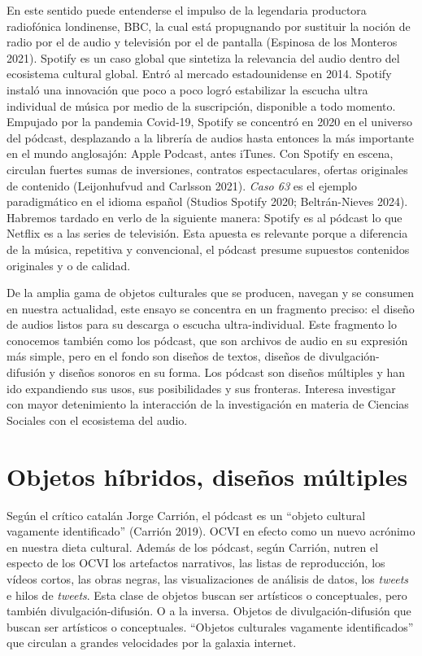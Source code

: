 \documentclass[
]{interact}
\begin{document}
En este sentido puede entenderse el impulso de la legendaria productora
radiofónica londinense, BBC, la cual está propugnando por sustituir la
noción de radio por el de audio y televisión por el de pantalla
(Espinosa de los Monteros 2021). Spotify es un caso global que sintetiza
la relevancia del audio dentro del ecosistema cultural global. Entró al
mercado estadounidense en 2014. Spotify instaló una innovación que poco
a poco logró estabilizar la escucha ultra individual de música por medio
de la suscripción, disponible a todo momento. Empujado por la pandemia
Covid-19, Spotify se concentró en 2020 en el universo del pódcast,
desplazando a la librería de audios hasta entonces la más importante en
el mundo anglosajón: Apple Podcast, antes iTunes. Con Spotify en escena,
circulan fuertes sumas de inversiones, contratos espectaculares, ofertas
originales de contenido (Leijonhufvud and Carlsson 2021). \emph{Caso 63}
es el ejemplo paradigmático en el idioma español (Studios Spotify 2020;
Beltrán-Nieves 2024). Habremos tardado en verlo de la siguiente manera:
Spotify es al pódcast lo que Netflix es a las series de televisión. Esta
apuesta es relevante porque a diferencia de la música, repetitiva y
convencional, el pódcast presume supuestos contenidos originales y o de
calidad.

De la amplia gama de objetos culturales que se producen, navegan y se
consumen en nuestra actualidad, este ensayo se concentra en un fragmento
preciso: el diseño de audios listos para su descarga o escucha
ultra-individual. Este fragmento lo conocemos también como los pódcast,
que son archivos de audio en su expresión más simple, pero en el fondo
son diseños de textos, diseños de divulgación-difusión y diseños sonoros
en su forma. Los pódcast son diseños múltiples y han ido expandiendo sus
usos, sus posibilidades y sus fronteras. Interesa investigar con mayor
detenimiento la interacción de la investigación en materia de Ciencias
Sociales con el ecosistema del audio.

\section{Objetos híbridos, diseños
múltiples}\label{objetos-huxedbridos-diseuxf1os-muxfaltiples}

Según el crítico catalán Jorge Carrión, el pódcast es un ``objeto
cultural vagamente identificado'' (Carrión 2019). OCVI en efecto como un
nuevo acrónimo en nuestra dieta cultural. Además de los pódcast, según
Carrión, nutren el especto de los OCVI los artefactos narrativos, las
listas de reproducción, los vídeos cortos, las obras negras, las
visualizaciones de análisis de datos, los \emph{tweets} e hilos de
\emph{tweets}. Esta clase de objetos buscan ser artísticos o
conceptuales, pero también divulgación-difusión. O a la inversa. Objetos
de divulgación-difusión que buscan ser artísticos o conceptuales.
``Objetos culturales vagamente identificados'' que circulan a grandes
velocidades por la galaxia internet.
\end{document}
